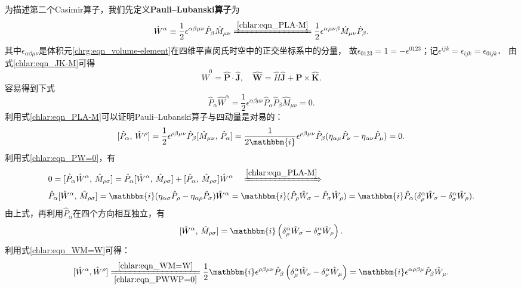 为描述第二个Casimir算子，我们先定义{\bfseries\heiti Pauli--Lubanski算子}为
\begin{equation}\label{chlar:eqn_Pauli-Lubanski}
	\hat{W}^\alpha \equiv \frac{1}{2}\epsilon^{\alpha\beta\mu\nu}\hat{P}_\beta \hat{M}_{\mu\nu}
	\xlongequal{\ref{chlar:eqn_PLA-M}} \frac{1}{2}\epsilon^{\alpha\mu\nu\beta} \hat{M}_{\mu\nu} \hat{P}_\beta  .
\end{equation}
其中$\epsilon_{\alpha\beta\mu\nu}$是体积元\eqref{chrg:eqn_volume-element}在四维平直闵氏时空中的正交坐标系中的分量，
故$\epsilon_{0123}=1=-\epsilon^{0123}$；记$\epsilon^{ijk}=\epsilon_{ijk}=\epsilon_{0ijk}$．
由式\eqref{chlar:eqn_JK-M}可得
\begin{equation}\label{chlar:eqn_Pauli-Lubanski-comp}
	\hat{W}^0 = \boldsymbol{\hat{P}}\cdot \boldsymbol{\hat{J}},\quad
	\boldsymbol{\hat{W}} =  \hat{H} \boldsymbol{\hat{J}} + \boldsymbol{\hat{P}}\times \boldsymbol{\hat{K}}.
\end{equation}
容易得到下式
\begin{equation}\label{chlar:eqn_PW=0}
	\hat{P}_\alpha \hat{W}^\alpha = \frac{1}{2}\epsilon^{\alpha\beta\mu\nu}\hat{P}_\alpha \hat{P}_\beta \hat{M}_{\mu\nu}=0 .
\end{equation}
利用式\eqref{chlar:eqn_PLA-M}可以证明Pauli--Lubanski算子与四动量是对易的：
\begin{equation}\label{chlar:eqn_PWWP=0}
	[\hat{P}_\alpha,\, \hat{W}^\rho] = 
	\frac{1}{2}\epsilon^{\rho\beta\mu\nu} \hat{P}_\beta [ \hat{M}_{\mu\nu},\, \hat{P}_\alpha]
	=\frac{1}{2\mathbbm{i}}\epsilon^{\rho\beta\mu\nu} \hat{P}_\beta 
	(\eta_{\alpha \mu} \hat{P}_\nu-\eta_{\alpha \nu} \hat{P}_\mu ) =0.    
\end{equation}
利用式\eqref{chlar:eqn_PW=0}，有
\begin{align*}
	&0=[\hat{P}_\alpha \hat{W}^\alpha,\, \hat{M}_{\rho \sigma} ]
	=\hat{P}_\alpha [ \hat{W}^\alpha,\, \hat{M}_{\rho \sigma} ]
	+[\hat{P}_\alpha ,\, \hat{M}_{\rho \sigma} ]\hat{W}^\alpha 
	\quad \xRightarrow{\ref{chlar:eqn_PLA-M}} \\
	&\hat{P}_\alpha [ \hat{W}^\alpha,\, \hat{M}_{\rho \sigma} ]= \mathbbm{i}
	(\eta_{\alpha \sigma} \hat{P}_\rho-\eta_{\alpha \rho} \hat{P}_\sigma)\hat{W}^\alpha
	= \mathbbm{i} (\hat{P}_\rho \hat{W}_\sigma-\hat{P}_\sigma \hat{W}_\rho)
	=\mathbbm{i} \hat{P}_\alpha (\delta_\rho^\alpha \hat{W}_\sigma -\delta_\sigma^\alpha \hat{W}_\rho) .
\end{align*}
由上式，再利用$\hat{P}_\alpha$在四个方向相互独立，有
\begin{equation}\label{chlar:eqn_WM=W}
	[\hat{W}^\alpha,\, \hat{M}_{\rho \sigma} ] =  \mathbbm{i} 
	\left(\delta^\alpha_\rho \hat{W}_\sigma-\delta^\alpha_\sigma \hat{W}_\rho  \right).
\end{equation}
利用式\eqref{chlar:eqn_WM=W}可得：
\begin{equation}\label{chlar:eqn_WW=PW}
	[\hat{W}^\alpha, \hat{W}^\rho] 
	\xlongequal[\ref{chlar:eqn_PWWP=0}]{\ref{chlar:eqn_WM=W}}
	\frac{1}{2}\mathbbm{i} \epsilon^{\rho \beta\mu\nu} \hat{P}_\beta 
	\left(\delta^\alpha_\mu \hat{W}_\nu - \delta^\alpha_\nu \hat{W}_\mu\right)
	=\mathbbm{i} \epsilon^{\alpha \rho \beta \mu }  \hat{P}_\beta \hat{W}_\mu   .
\end{equation}


